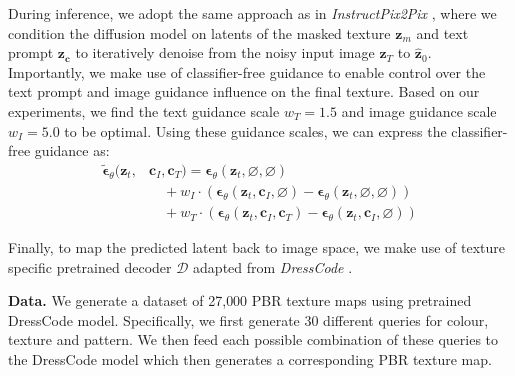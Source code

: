 \documentclass[11pt,twocolumn]{article}
\begin{document}
During inference, we adopt the same approach as in \textit{InstructPix2Pix} \cite{instructpix2pix}, 
where we condition the diffusion model on latents of the masked texture $\mathbf{z}_m$ and text prompt 
$\mathbf{z_c}$ to iteratively denoise from the noisy input image $\mathbf{z}_T$ to $\hat{\mathbf{z}}_0$. 
Importantly, we make use of classifier-free guidance \cite{cfg} to enable control over the text prompt and 
image guidance influence on the final texture. Based on our experiments, we find the text guidance scale $w_T = 1.5$ 
and image guidance scale $w_I = 5.0$ to be optimal. Using these guidance scales, we can express the classifier-free guidance as:
\vspace{0.0em}
\begin{align*}
  \tilde{\boldsymbol{\epsilon}}_{\theta}(\mathbf{z}_t, &\mathbf{c}_I, \mathbf{c}_T) = \boldsymbol{\epsilon}_{\theta}(\mathbf{z}_t, \varnothing, \varnothing) \\
  &\quad + w_I \cdot \left( \boldsymbol{\epsilon}_{\theta}(\mathbf{z}_t, \mathbf{c}_I, \varnothing) - \boldsymbol{\epsilon}_{\theta}(\mathbf{z}_t, \varnothing, \varnothing) \right) \\
  &\quad + w_T \cdot \left( \boldsymbol{\epsilon}_{\theta}(\mathbf{z}_t, \mathbf{c}_I, \mathbf{c}_T) - \boldsymbol{\epsilon}_{\theta}(\mathbf{z}_t, \mathbf{c}_I, \varnothing) \right)
\end{align*}

Finally, to map the predicted latent back to image space, we make use of texture specific pretrained 
decoder $\mathcal{D}$ adapted from \textit{DressCode} \cite{dresscode}.


\textbf{Data.} We generate a dataset of 27{,}000 PBR texture maps using pretrained DressCode \cite{dresscode} model. Specifically,
we first generate 30 different queries for colour, texture and pattern. We then feed each possible combination of these
queries to the DressCode model which then generates a corresponding PBR texture map.







\end{document}
